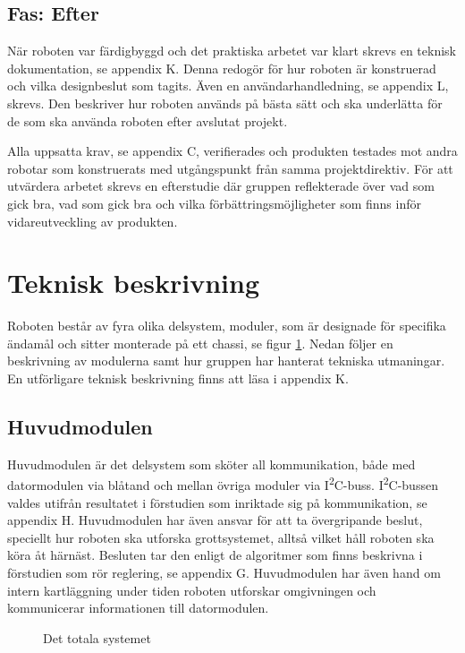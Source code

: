 \documentclass[11pt]{article}
\begin{document}
\begin{flushleft}
\subsection{Fas: Efter}
När roboten var färdigbyggd och det praktiska arbetet var klart skrevs en teknisk dokumentation, se appendix K. Denna redogör för hur roboten är konstruerad och vilka designbeslut som tagits. Även en användarhandledning, se appendix L, skrevs. Den beskriver hur roboten används på bästa sätt och ska underlätta för de som ska använda roboten efter avslutat projekt.

Alla uppsatta krav, se appendix C, verifierades och produkten testades mot andra robotar som konstruerats med utgångspunkt från samma projektdirektiv. För att utvärdera arbetet skrevs en efterstudie där gruppen reflekterade över vad som gick bra, vad som gick bra och vilka förbättringsmöjligheter som finns inför vidareutveckling av produkten.

\pagebreak

\section{Teknisk beskrivning}
Roboten består av fyra olika delsystem, moduler, som är designade för specifika ändamål och sitter monterade på ett chassi, se figur \ref{overview}. Nedan följer en beskrivning av modulerna samt hur gruppen har hanterat tekniska utmaningar. En utförligare teknisk beskrivning finns att läsa i appendix K. 


\subsection{Huvudmodulen}
Huvudmodulen är det delsystem som sköter all kommunikation, både med datormodulen via blåtand och mellan övriga moduler via I\textsuperscript{2}C-buss. I\textsuperscript{2}C-bussen valdes utifrån resultatet i förstudien som inriktade sig på kommunikation, se appendix H. Huvudmodulen har även ansvar för att ta övergripande beslut, speciellt hur roboten ska utforska grottsystemet, alltså vilket håll roboten ska köra åt härnäst. Besluten tar den enligt de algoritmer som finns beskrivna i förstudien som rör reglering, se appendix G. Huvudmodulen har även hand om intern kartläggning under tiden roboten utforskar omgivningen och kommunicerar informationen till datormodulen. 

\begin{figure}[!htbp]
\centering
\noindent\resizebox{.7\linewidth}{!}{
	}
	\caption{Det totala systemet \label{overview}}	
\end{figure}


\end{flushleft}
\end{document}

